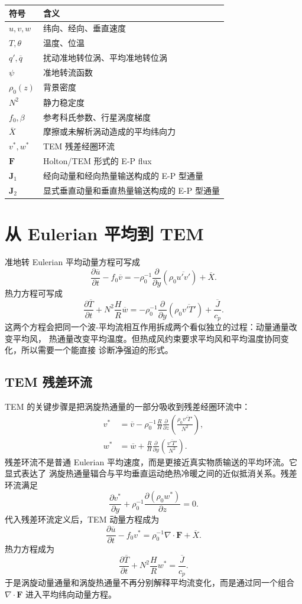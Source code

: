 \documentclass[UTF8,a4paper,12pt]{ctexart}
\newcommand{\mean}[1]{\overline{#1}}
\newcommand{\p}{\partial}
\newcommand{\bF}{\bm{F}}
\newcommand{\bJ}{\bm{J}}
\begin{document}
\begin{table}[H]
  \centering
  \begin{tabular}{ll}
    \toprule
    符号 & 含义 \\
    \midrule
    $u,v,w$ & 纬向、经向、垂直速度 \\
    $T,\theta$ & 温度、位温 \\
    $q',\mean{q}$ & 扰动准地转位涡、平均准地转位涡 \\
    $\psi$ & 准地转流函数 \\
    $\rho_0(z)$ & 背景密度 \\
    $N^2$ & 静力稳定度 \\
    $f_0,\beta$ & 参考科氏参数、行星涡度梯度 \\
    $\mean{X}$ & 摩擦或未解析涡动造成的平均纬向力 \\
    $v^*,w^*$ & TEM 残差经圈环流 \\
    $\bF$ & Holton/TEM 形式的 E-P flux \\
    $\bJ_1$ & 经向动量和经向热量输送构成的 E-P 型通量 \\
    $\bJ_2$ & 显式垂直动量和垂直热量输送构成的 E-P 型通量 \\
    \bottomrule
  \end{tabular}
\end{table}

\section{从 Eulerian 平均到 TEM}

准地转 Eulerian 平均动量方程可写成
\[
  \frac{\p\mean{u}}{\p t}
  -f_0\mean{v}
  =
  -\rho_0^{-1}\frac{\p}{\p y}\left(\rho_0\mean{u'v'}\right)
  +\mean{X}.
\]
热力方程可写成
\[
  \frac{\p\mean{T}}{\p t}
  +N^2\frac{H}{R}\mean{w}
  =
  -\rho_0^{-1}\frac{\p}{\p y}\left(\rho_0\mean{v'T'}\right)
  +\frac{\mean{J}}{c_p}.
\]
这两个方程会把同一个波-平均流相互作用拆成两个看似独立的过程：动量通量改变平均风，
热通量改变平均温度。但热成风约束要求平均风和平均温度协同变化，所以需要一个能直接
诊断净强迫的形式。

\subsection{TEM 残差环流}

TEM 的关键步骤是把涡旋热通量的一部分吸收到残差经圈环流中：
\begin{align}
  v^*
  &=
  \mean{v}
  -\rho_0^{-1}\frac{R}{H}
  \frac{\p}{\p z}
  \left(
    \frac{\rho_0\mean{v'T'}}{N^2}
  \right),\\
  w^*
  &=
  \mean{w}
  +\frac{R}{H}
  \frac{\p}{\p y}
  \left(
    \frac{\mean{v'T'}}{N^2}
  \right).
\end{align}
残差环流不是普通 Eulerian 平均速度，而是更接近真实物质输送的平均环流。它显式表达了
涡旋热通量辐合与平均垂直运动绝热冷暖之间的近似抵消关系。残差环流满足
\[
  \frac{\p v^*}{\p y}
  +\rho_0^{-1}\frac{\p(\rho_0 w^*)}{\p z}=0.
\]
代入残差环流定义后，TEM 动量方程成为
\[
  \frac{\p\mean{u}}{\p t}
  -f_0v^*
  =\rho_0^{-1}\nabla\cdot\bF+\mean{X}.
\]
热力方程成为
\[
  \frac{\p\mean{T}}{\p t}
  +N^2\frac{H}{R}w^*
  =\frac{\mean{J}}{c_p}.
\]
于是涡旋动量通量和涡旋热通量不再分别解释平均流变化，而是通过同一个组合
$\nabla\cdot\bF$ 进入平均纬向动量方程。
\end{document}
